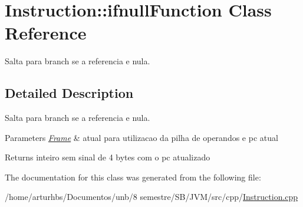 \hypertarget{classInstruction_1_1ifnullFunction}{}\section{Instruction\+:\+:ifnull\+Function Class Reference}
\label{classInstruction_1_1ifnullFunction}


Salta para branch se a referencia e nula.  




\subsection{Detailed Description}
Salta para branch se a referencia e nula. 


\begin{DoxyParams}{Parameters}
{\em \hyperlink{classFrame}{Frame}} & atual para utilizacao da pilha de operandos e pc atual \\
\hline
\end{DoxyParams}
\begin{DoxyReturn}{Returns}
inteiro sem sinal de 4 bytes com o pc atualizado 
\end{DoxyReturn}


The documentation for this class was generated from the following file\+:\begin{DoxyCompactItemize}
\item 
/home/arturhbs/\+Documentos/unb/8 semestre/\+S\+B/\+J\+V\+M/src/cpp/\hyperlink{Instruction_8cpp}{Instruction.\+cpp}\end{DoxyCompactItemize}
